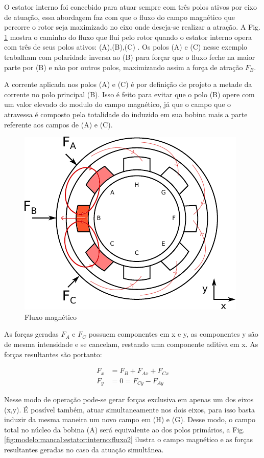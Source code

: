O estator interno foi concebido para atuar sempre com três polos ativos por eixo de atuação, essa abordagem faz com que o fluxo do campo magnético que percorre o rotor seja maximizado no eixo onde deseja-se realizar a atração. A Fig. \ref{fig:modelo:mancal:estator:interno:fluxo} mostra o caminho do fluxo que flui pelo rotor quando o estator interno opera com três de seus polos ativos: (A),(B),(C) . Os polos (A) e (C) nesse exemplo trabalham com polaridade inversa ao (B) para forçar que o fluxo feche na maior parte por (B) e não por outros polos, maximizando assim a força de atração $F_B$. 

A corrente aplicada nos polos (A) e (C) é por definição de projeto a metade da corrente no polo principal (B). Isso é feito para evitar que o polo (B) opere com um valor elevado do modulo do campo magnético, já que o campo que o atravessa é composto pela totalidade do induzido em sua bobina mais a parte referente aos campos de (A) e (C).

\begin{figure}[ht!]
	\centering
	\includegraphics[width=0.7\linewidth]{./Figs/modelo_mancal_estator_interno_fluxo}
	\caption{Fluxo magnético}
	\label{fig:modelo:mancal:estator:interno:fluxo}
\end{figure}

As forças geradas $F_A$ e $F_C$ possuem componentes em x e y, as componentes y são de mesma intensidade e se cancelam, restando uma componente aditiva em x. As forças resultantes são portanto:

\begin{align}
 	F_x &= F_B + F_{Ax} + F_{Cx} \\
 	F_y &= 0 = F_{Cy} - F_{Ay} 
\end{align}


Nesse modo de operação pode-se gerar forças exclusiva em apenas um dos eixos (x,y). É possível também, atuar simultaneamente nos dois eixos, para isso basta induzir da mesma maneira um novo campo em (H) e (G). Desse modo, o campo total no núcleo da bobina (A) será equivalente ao dos polos primários, a Fig. \ref{fig:modelo:mancal:estator:interno:fluxo2} ilustra o campo magnético e as forças resultantes geradas no caso da atuação simultânea.

